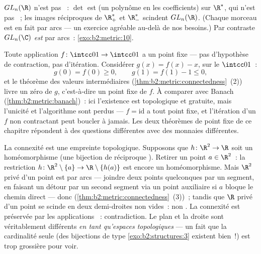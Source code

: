 \begin{example}\label{ex:b2:metric:glnr}
$GL_n(\R)$ n'est pas ~: $\det$ est  (un polynôme en les
coefficients) sur $\R^*$, qui n'est pas ~; les images
réciproques de $\R_+^*$ et $\R_-^*$ scindent $GL_n(\R)$. (Chaque
morceau est en fait  par arcs --- un exercice agréable
au-delà de nos besoins.) Par contraste $GL_n(\C)$ \emph{est} 
par arcs~: \cref{exo:b2:metric:10}.
\end{example}

\begin{example}\label{ex:b2:metric:ivtfixed}
Toute application  $f \colon \intcc01 \to \intcc01$ a un
point fixe --- pas d'hypothèse de contraction, pas d'itération.
Considérer $g(x) = f(x) - x$,  sur le  $\intcc01$~:
\[
g(0) = f(0) \geq 0,
\qquad
g(1) = f(1) - 1 \leq 0 ,
\]
et le théorème des valeurs intermédiaires
(\cref{thm:b2:metric:connectedness}~(2)) livre un zéro de $g$,
c'est-à-dire un point fixe de $f$. À comparer avec Banach
(\cref{thm:b2:metric:banach})~: ici l'existence est topologique et
gratuite, mais l'unicité et l'algorithme sont perdus --- $f =
\mathrm{id}$ a tout point fixe, et l'itération d'un $f$ non
contractant peut boucler à jamais. Les deux théorèmes de point fixe
de ce chapitre répondent à des questions différentes avec des
monnaies différentes.
\end{example}

\begin{example}\label{ex:b2:metric:rnotr2}
La connexité est une empreinte topologique. Supposons que $h \colon
\R^2 \to \R$ soit un homéomorphisme (une bijection  de
réciproque ). Retirer un point $a \in \R^2$~: la restriction
$h \colon \R^2\setminus\{a\} \to \R\setminus\{h(a)\}$ est encore un
homéomorphisme. Mais $\R^2$ privé d'un point est  par arcs ---
joindre deux points quelconques par un segment, en faisant un détour
par un second segment via un point auxiliaire si $a$ bloque le chemin
direct --- donc  (\cref{thm:b2:metric:connectedness}~(3))~;
tandis que $\R$ privé d'un point se scinde en deux demi-droites
 non vides~: non . La connexité est préservée par les
applications ~: contradiction. Le plan et la droite sont
véritablement différents \emph{en tant qu'espaces topologiques} ---
un fait que la cardinalité seule (des bijections de type
\cref{exo:b2:structures:3} existent bien~!) est trop grossière pour
voir.
\end{example}

